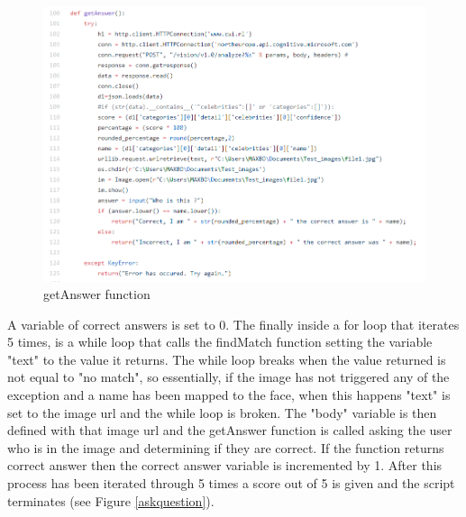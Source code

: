 \documentclass[12pt,a4paper]{article}
\begin{document}
\begin{figure}[!ht]
    \centering
    \includegraphics[width=1.0\textwidth]{Figs/getanswer.PNG} 
    \caption{getAnswer function} 
    \label{getAnswer}
\end{figure}  

A variable of correct answers is set to 0. The finally inside a for loop that iterates 5 times, is a while loop that calls the findMatch function setting the variable "text" to the value it returns. The while loop breaks when the value returned is not equal to "no match", so essentially, if the image has not triggered any of the exception and a name has been mapped to the face, when this happens "text" is set to the image url and the while loop is broken. The "body" variable is then defined with that image url and the getAnswer function is called asking the user who is in the image and determining if they are correct. If the function returns correct answer then the correct answer variable is incremented by 1. After this process has been iterated through 5 times a score out of 5 is given and the script terminates (see Figure \ref{askquestion}).
\end{document}
